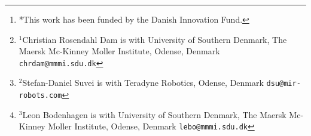 \author{Christian Rosendahl Dam$^{1}$, Stefan-Daniel Suvei$^{2}$ \\
and Leon Bodenhagen$^{3}$%
\thanks{*This work has been funded by the Danish Innovation Fund.}%
\thanks{$^{1}$Christian Rosendahl Dam is with University of Southern Denmark,
        The Maersk Mc-Kinney Moller Institute,
        Odense, Denmark
        {\tt\small chrdam@mmmi.sdu.dk}}%
\thanks{$^{2}$Stefan-Daniel Suvei is with Teradyne Robotics,
        Odense, Denmark
        {\tt\small dsu@mir-robots.com}}%
\thanks{$^{3}$Leon Bodenhagen is with University of Southern Denmark,
        The Maersk Mc-Kinney Moller Institute,
        Odense, Denmark
        {\tt\small lebo@mmmi.sdu.dk}}%
}
